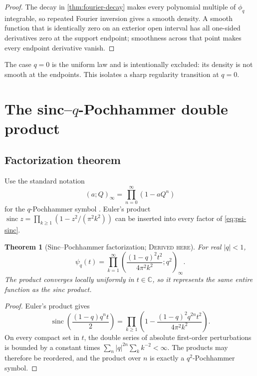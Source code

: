 \documentclass[11pt,oneside]{article}
\newtheorem{theorem}{Theorem}[section]
\theoremstyle{definition}
\theoremstyle{remark}
\newcommand{\C}{\mathbb C}
\newcommand{\sinc}{\operatorname{sinc}}
\newcommand{\Derived}{\textsc{Derived here}}
\begin{document}
\begin{proof}
The decay in \cref{thm:fourier-decay} makes every polynomial multiple of
\(\phi_q\) integrable, so repeated Fourier inversion gives a smooth density.
A smooth function that is identically zero on an exterior open interval has
all one-sided derivatives zero at the support endpoint; smoothness across that
point makes every endpoint derivative vanish.
\end{proof}

The case \(q=0\) is the uniform law and is intentionally excluded: its density
is not smooth at the endpoints.  This isolates a sharp regularity transition at
\(q=0\).

\section{The sinc--\texorpdfstring{\(q\)}{q}-Pochhammer double product}

\subsection{Factorization theorem}
Use the standard notation
\[
 (a;Q)_\infty=\prod_{n=0}^{\infty}(1-aQ^n)
\]
for the \(q\)-Pochhammer symbol \cite{dlmf}.  Euler's product
\(\sinc z=\prod_{k\ge1}(1-z^2/(\pi^2k^2))\) can be inserted into every factor
of \eqref{eq:psi-sinc}.

\begin{theorem}[Sinc--Pochhammer factorization; \Derived]\label{thm:sinc-poch}
For real \(|q|<1\),
\begin{equation}\label{eq:sinc-poch}
 \boxed{
 \psi_q(t)=\prod_{k=1}^{\infty}
 \left(\frac{(1-q)^2t^2}{4\pi^2k^2};q^2\right)_\infty.}
\end{equation}
The product converges locally uniformly in \(t\in\C\), so it represents the
same entire function as the sinc product.
\end{theorem}

\begin{proof}
Euler's product gives
\[
 \sinc\!\left(\frac{(1-q)q^nt}{2}\right)
 =\prod_{k\ge1}\left(1-
 \frac{(1-q)^2q^{2n}t^2}{4\pi^2k^2}\right).
\]
On every compact set in \(t\), the double series of absolute first-order
perturbations is bounded by a constant times
\(\sum_n|q|^{2n}\sum_kk^{-2}<\infty\).  The products may therefore be
reordered, and the product over \(n\) is exactly a \(q^2\)-Pochhammer symbol.
\end{proof}
\end{document}
